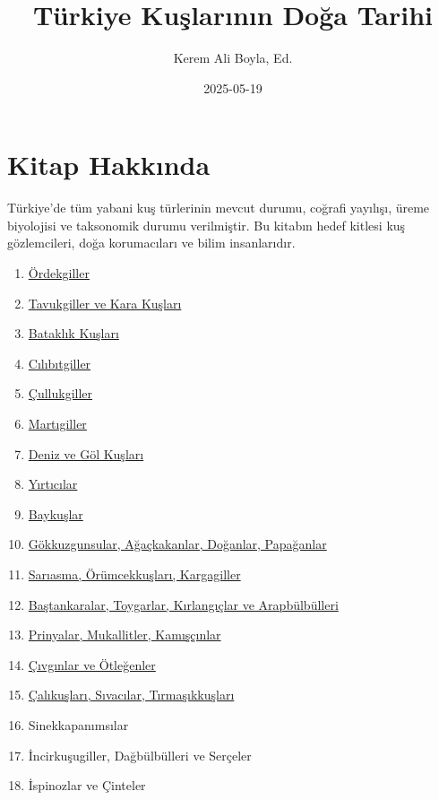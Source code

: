 \documentclass[
  a4paper,
  DIV=11,
  numbers=noendperiod]{scrartcl}
\title{Türkiye Kuşlarının Doğa Tarihi}
\author{Kerem Ali Boyla, Ed.}
\date{2025-05-19}
\providecommand{\tightlist}{%
  \setlength{\itemsep}{0pt}\setlength{\parskip}{0pt}}\usepackage{longtable,booktabs,array}
\renewcommand*\contentsname{Table of contents}
\newcommand\contentsname{Table of contents}
\begin{document}
\maketitle

\renewcommand*\contentsname{Table of contents}
{
\hypersetup{linkcolor=}
\setcounter{tocdepth}{2}
\tableofcontents
}


\chapter*{Kitap Hakkında}\label{kitap-hakkux131nda}


Türkiye'de tüm yabani kuş türlerinin mevcut durumu, coğrafi yayılışı,
üreme biyolojisi ve taksonomik durumu verilmiştir. Bu kitabın hedef
kitlesi kuş gözlemcileri, doğa korumacıları ve bilim insanlarıdır.

\begin{enumerate}
\def\labelenumi{\arabic{enumi}.}
\tightlist
\item
  \href{01_ordekgiller.html}{Ördekgiller}
\item
  \href{02_tavukgiller_vd.html}{Tavukgiller ve Kara Kuşları}
\item
  \href{03_bataklik-kuslari.html}{Bataklık Kuşları}
\item
  \href{04_cilibitlar.html}{Cılıbıtgiller}
\item
  \href{05_cullukgiller.html}{Çullukgiller}
\item
  \href{06_martilar.html}{Martıgiller}
\item
  \href{07_deniz-ve-gol-kuslari.html}{Deniz ve Göl Kuşları}
\item
  \href{08_yirticilar.html}{Yırtıcılar}
\item
  \href{09_baykuslar.html}{Baykuşlar}
\item
  \href{10_otucu-oncesi.html}{Gökkuzgunsular, Ağaçkakanlar, Doğanlar,
  Papağanlar}
\item
  \href{11_kargamsilar.html}{Sarıasma, Örümcekkuşları, Kargagiller}
\item
  \href{12_toygarlar.html}{Baştankaralar, Toygarlar, Kırlangıçlar ve
  Arapbülbülleri}
\item
  \href{13_kamiscinlar.html}{Prinyalar, Mukallitler, Kamışçınlar}
\item
  \href{14_otlegenler.html}{Çıvgınlar ve Ötleğenler}
\item
  \href{15_tirmasiklar.qmd}{Çalıkuşları, Sıvacılar, Tırmaşıkkuşları}
\item
  Sinekkapanımsılar
\item
  İncirkuşugiller, Dağbülbülleri ve Serçeler
\item
  İspinozlar ve Çinteler
\end{enumerate}
\end{document}

